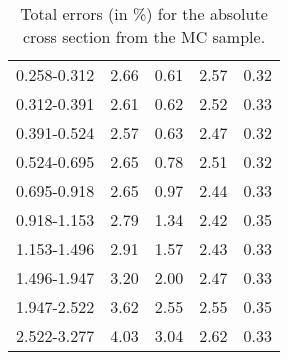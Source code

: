 \begin{table}
\begin{center}
\begin{tabular}{@{}l l l l l@{}}
            0.258-0.312 & 2.66 & 0.61 & 2.57 & 0.32  \\
            0.312-0.391 & 2.61 & 0.62 & 2.52 & 0.33  \\
            0.391-0.524 & 2.57 & 0.63 & 2.47 & 0.32  \\
            0.524-0.695 & 2.65 & 0.78 & 2.51 & 0.32  \\
            0.695-0.918 & 2.65 & 0.97 & 2.44 & 0.33  \\
            0.918-1.153 & 2.79 & 1.34 & 2.42 & 0.35  \\
            1.153-1.496 & 2.91 & 1.57 & 2.43 & 0.33  \\
            1.496-1.947 & 3.20 & 2.00 & 2.47 & 0.33  \\
            1.947-2.522 & 3.62 & 2.55 & 2.55 & 0.35  \\
            2.522-3.277 & 4.03 & 3.04 & 2.62 & 0.33  \\
            \bottomrule
        \end{tabular}
    \end{center}
    \caption{
        Total errors (in \%) for the absolute cross section from the \POWHEG
        MC sample.
    }
    \label{tab:powheg_uncert_abs}
\end{table}
